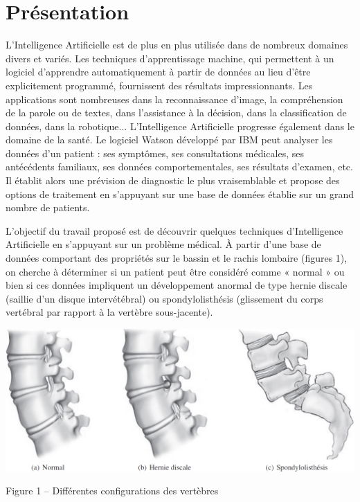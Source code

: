 \section{Présentation}
\ifprof
\else
L’Intelligence Artificielle est de plus en plus utilisée dans de nombreux domaines divers et variés.
Les techniques d’apprentissage machine, qui permettent à un logiciel d’apprendre automatiquement à
partir de données au lieu d’être explicitement programmé, fournissent des résultats impressionnants.
Les applications sont nombreuses dans la reconnaissance d’image, la compréhension de la parole ou
de textes, dans l’assistance à la décision, dans la classification de données, dans la robotique...
L’Intelligence Artificielle progresse également dans le domaine de la santé. Le logiciel Watson développé
par IBM peut analyser les données d’un patient : ses symptômes, ses consultations médicales,
ses antécédents familiaux, ses données comportementales, ses résultats d’examen, etc. Il établit alors
une prévision de diagnostic le plus vraisemblable et propose des options de traitement en s’appuyant
sur une base de données établie sur un grand nombre de patients.

\begin{obj}
L’objectif du travail proposé est de découvrir quelques techniques d’Intelligence Artificielle en
s’appuyant sur un problème médical. À partir d’une base de données comportant des propriétés
sur le bassin et le rachis lombaire (figures 1), on cherche à déterminer si un patient peut être
considéré comme « normal » ou bien si ces données impliquent un développement anormal de
type hernie discale (saillie d’un disque intervétébral) ou spondylolisthésis (glissement du corps
vertébral par rapport à la vertèbre sous-jacente).
\end{obj}

\begin{center}
\includegraphics[width=.8\textwidth]{images/fig_01}

Figure 1 -- Différentes configurations des vertèbres
\end{center}

